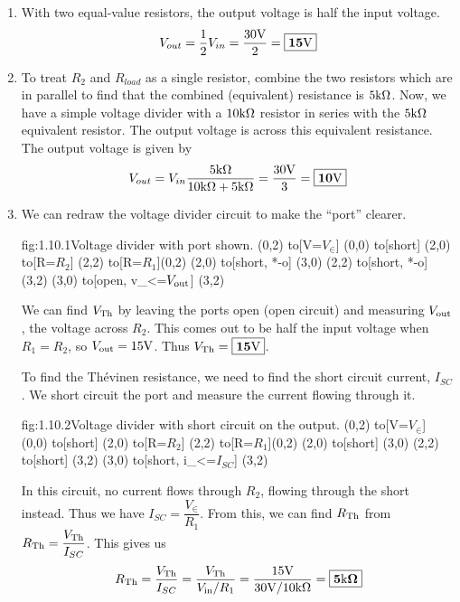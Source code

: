 \documentclass{article}
\begin{document}
    \begin{enumerate}
        \item 
        With two equal-value resistors, the output voltage is half the input voltage.
        \[V_{out} = \frac{1}{2}V_{in} = \frac{30\text{V}}{2} = \boxed{\mathbf{15\text{V}}}\]

        \item 
        To treat $R_2$ and $R_{load}$ as a single resistor, combine the two resistors which are in parallel to find that the combined (equivalent) resistance is $5\text{k}\Omega$. Now, we have a simple voltage divider with a $10\text{k}\Omega$ resistor in series with the $5\text{k}\Omega$ equivalent resistor. The output voltage is across this equivalent resistance. The output voltage is given by 
        \[V_{out} = V_{in} \frac{5\text{k}\Omega}{10\text{k}\Omega + 5\text{k}\Omega} = \frac{30\text{V}}{3} = \boxed{\mathbf{10\text{V}}} \]

        \item 
        We can redraw the voltage divider circuit to make the ``port'' clearer. 
        \begin{circuit}{fig:1.10.1}{Voltage divider with port shown.}
            (0,2) to[V=$V_{\in}$] (0,0)
            to[short] (2,0)
            to[R=$R_2$] (2,2)
            to[R=$R_1$](0,2)
            (2,0) to[short, *-o] (3,0)
            (2,2) to[short, *-o] (3,2)
            (3,0) to[open, v_<=$V_{\text{out}}$] (3,2)
        \end{circuit}

        We can find $V_{\text{Th}}$ by leaving the ports open (open circuit) and measuring $V_{\text{out}}$, the voltage across $R_2$. This comes out to be half the input voltage when $R_1 = R_2$, so $V_{\text{out}} = 15\text{V}$. Thus $V_{\text{Th}} = \boxed{\mathbf{15\text{V}}}$.
        
        To find the Th\'evinen resistance, we need to find the short circuit current, $I_{SC}$. We short circuit the port and measure the current flowing through it.
        \begin{circuit}{fig:1.10.2}{Voltage divider with short circuit on the output.}
            (0,2) to[V=$V_{\in}$] (0,0) 
            to[short] (2,0)
            to[R=$R_2$] (2,2)
            to[R=$R_1$](0,2)
            (2,0) to[short] (3,0)
            (2,2) to[short] (3,2)
            (3,0) to[short, i_<=$I_{SC}$] (3,2) 
        \end{circuit}
        
        In this circuit, no current flows through $R_2$, flowing through the short instead. Thus we have $I_{SC} = \dfrac{V_\in }{R_1}$. From this, we can find $R_{\text{Th}}$ from $R_{\text{Th}} = \dfrac{V_{\text{Th}}}{I_{SC}}$. This gives us 
        \[R_{\text{Th}} = \frac{V_{\text{Th}}}{I_{SC}} = \frac{V_{\text{Th}}}{V_{\text{in}}/R_1} = \frac{15\text{V}}{30\text{V}/10\text{k}\Omega} = \boxed{\mathbf{5\text{k}\Omega}}\]


\end{enumerate}
\end{document}

